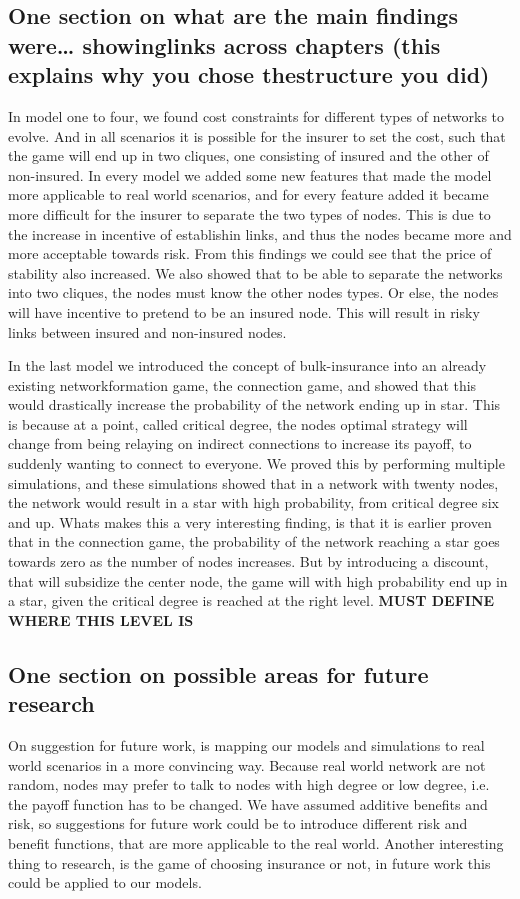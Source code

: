 \subsection{One section on what are the main findings were… showinglinks across chapters (this explains why you chose thestructure you did)}
In model one to four, we found cost constraints for different types of networks to evolve. And in all scenarios it is possible for the insurer to set the cost, such that the game will end up in two cliques, one consisting of insured and the other of non-insured. 
In every model we added some new features that made the model more applicable to real world scenarios, and for every feature added it became more difficult for the insurer to separate the two types of nodes. This is due to the increase in incentive of establishin links, and thus the nodes became more and more acceptable towards risk. From this findings we could see that the price of stability also increased. 
We also showed that to be able to separate the networks into two cliques, the nodes must know the other nodes types. Or else, the nodes will have incentive to pretend to be an insured node. This will result in risky links between insured and non-insured nodes. 

In the last model we introduced the concept of bulk-insurance into an already existing networkformation game, the connection game, and showed that this would drastically increase the probability of the network ending up in star. This is because at a point, called critical degree, the nodes optimal strategy will change from being relaying on indirect connections to increase its payoff, to suddenly wanting to connect to everyone. 
We proved this by performing multiple simulations, and these simulations showed that in a network with twenty nodes, the network would result in a star with high probability, from critical degree six and up. 
Whats makes this a very interesting finding, is that it is earlier proven that in the connection game, the probability of the network reaching a star goes towards zero as the number of nodes increases. But by introducing a discount, that will subsidize the center node, the game will with high probability end up in a star, given the critical degree is reached at the right level. \textbf{MUST DEFINE WHERE THIS LEVEL IS}

\subsection{One section on possible areas for future research}
On suggestion for future work, is mapping our models and simulations to real world scenarios in a more convincing way. Because real world network are not random, nodes may prefer to talk to nodes with high degree or low degree, i.e. the payoff function has to be changed. We have assumed additive benefits and risk, so suggestions for future work could be to introduce different risk and benefit functions, that are more applicable to the real world. 
Another interesting thing to research, is the game of choosing insurance or not, in future work this could be applied to our models.
 
